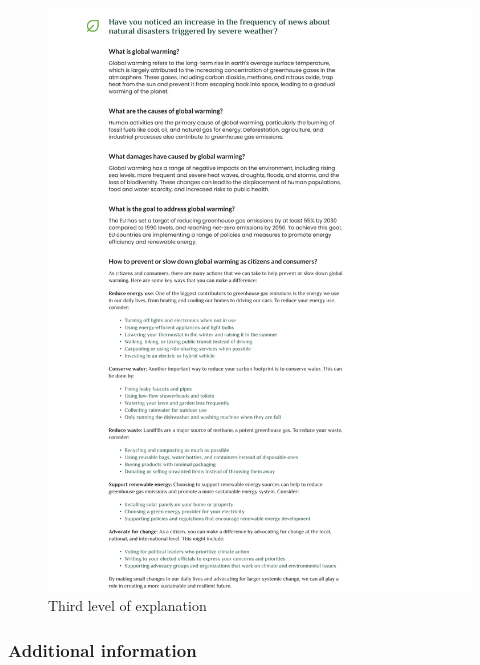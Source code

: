 \begin{description}
\begin{figure}[h!]
      \includegraphics[width=\textwidth]{Images/level3.png}
      \caption{Third level of explanation}
      \label{fig:level3}
    \end{figure}
\end{description}


\subsubsection{Additional information}

